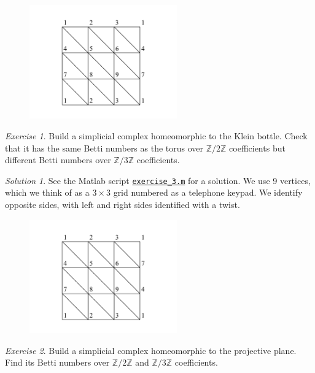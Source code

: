 \documentclass[amscd, amssymb, verbatim]{amsart}[12pt]
\theoremstyle{remark}
\theoremstyle{remark}
\newtheorem{exerciseSol}{Exercise}
\theoremstyle{remark}
\newtheorem*{solution}{Solution}
\newcommand{\Z}{\mathbb{Z}}
\begin{document}
\begin{figure}[htp]
  \begin{center}
    \includegraphics[width=2.5in]{torus}
   \end{center}
\end{figure}
\FloatBarrier

\begin{exerciseSol}
Build a simplicial complex homeomorphic to the Klein bottle. Check that it has the same Betti numbers as the torus over $\Z/2\Z$ coefficients but different Betti numbers over $\Z/3\Z$ coefficients.
\end{exerciseSol}

\begin{solution}
See the Matlab script \href{https://github.com/appliedtopology/javaplex/tree/master/src/matlab/for_distribution/tutorial_solutions/exercise_3.m}{\texttt{exercise\_3.m}} for a solution. We use 9 vertices, which we think of as a $3 \times 3$ grid numbered as a telephone keypad. We identify opposite sides, with left and right sides identified with a twist. 
\end{solution}

\begin{figure}[htp]
  \begin{center}
    \includegraphics[width=2.5in]{klein}
   \end{center}
\end{figure}
\FloatBarrier

\begin{exerciseSol}
Build a simplicial complex homeomorphic to the projective plane. Find its Betti numbers over $\Z/2\Z$ and $\Z/3\Z$ coefficients.
\end{exerciseSol}
\end{document}
